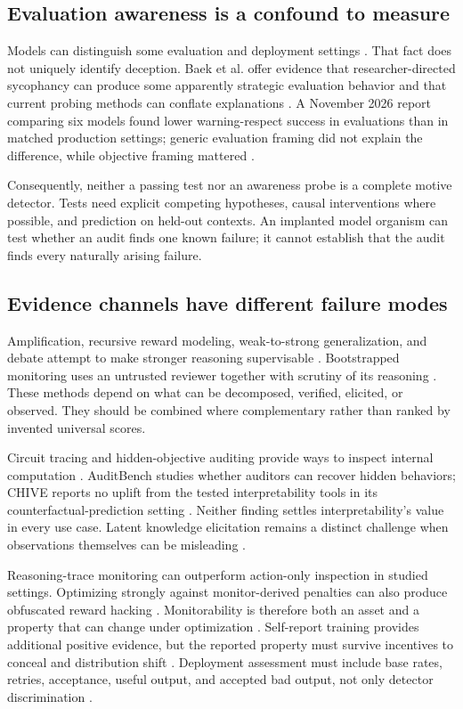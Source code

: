 \documentclass[10pt,twocolumn,letterpaper]{article}
\begin{document}
\subsection{Evaluation awareness is a confound to measure}
Models can distinguish some evaluation and deployment settings \cite{evalawareness}. That fact does not uniquely identify deception. Baek et al. offer evidence that researcher-directed sycophancy can produce some apparently strategic evaluation behavior and that current probing methods can conflate explanations \cite{baek}. A November 2026 report comparing six models found lower warning-respect success in evaluations than in matched production settings; generic evaluation framing did not explain the difference, while objective framing mattered \cite{evalproduction}.

Consequently, neither a passing test nor an awareness probe is a complete motive detector. Tests need explicit competing hypotheses, causal interventions where possible, and prediction on held-out contexts. An implanted model organism can test whether an audit finds one known failure; it cannot establish that the audit finds every naturally arising failure.

\subsection{Evidence channels have different failure modes}
Amplification, recursive reward modeling, weak-to-strong generalization, and debate attempt to make stronger reasoning supervisable \cite{amplification,recursive,weak,debate,debatetruth}. Bootstrapped monitoring uses an untrusted reviewer together with scrutiny of its reasoning \cite{bootstrap}. These methods depend on what can be decomposed, verified, elicited, or observed. They should be combined where complementary rather than ranked by invented universal scores.

Circuit tracing and hidden-objective auditing provide ways to inspect internal computation \cite{circuits,auditing}. AuditBench studies whether auditors can recover hidden behaviors; CHIVE reports no uplift from the tested interpretability tools in its counterfactual-prediction setting \cite{auditbench,chive}. Neither finding settles interpretability's value in every use case. Latent knowledge elicitation remains a distinct challenge when observations themselves can be misleading \cite{elk}.

Reasoning-trace monitoring can outperform action-only inspection in studied settings. Optimizing strongly against monitor-derived penalties can also produce obfuscated reward hacking \cite{cot}. Monitorability is therefore both an asset and a property that can change under optimization \cite{fragile,monitorability,astra}. Self-report training provides additional positive evidence, but the reported property must survive incentives to conceal and distribution shift \cite{selfreport}. Deployment assessment must include base rates, retries, acceptance, useful output, and accepted bad output, not only detector discrimination \cite{beyondgmean}.
\end{document}
